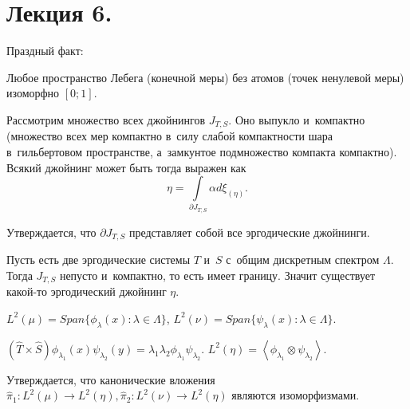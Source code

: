 \documentclass{article}
\begin{document}
\section*{Лекция 6. }
\resetcntrs

Праздный факт:
\begin{theorem}[Рохлин]
	Любое пространство Лебега (конечной меры) без атомов (точек ненулевой меры)
	изоморфно $[0; 1]$.
\end{theorem}

Рассмотрим множество всех джойнингов $J_{T,S}$. Оно выпукло и~компактно
(множество всех мер компактно в~силу слабой компактности шара в~гильбертовом
пространстве, а~замкунтое подмножество компакта компактно). Всякий джойнинг
может быть тогда выражен как
$$ \eta = \int\limits_{\partial J_{T,S}} \alpha d\xi_{(\eta)}. $$

Утверждается, что $\partial J_{T,S}$ представляет собой все эргодические
джойнинги.

Пусть есть две эргодические системы $T$ и~$S$ с~общим дискретным спектром
$\Lambda$. Тогда $J_{T,S}$ непусто и~компактно, то есть имеет границу. Значит
существует какой-то эргодический джойнинг $\eta$.

$L^2(\mu) = Span\{ \phi_\lambda(x): \lambda \in \Lambda \}$,
$L^2(\nu) = Span\{ \psi_\lambda(x): \lambda \in \Lambda \}$.

$(\hat T \times \hat S) \phi_{\lambda_1}(x) \psi_{\lambda_2}(y) = \lambda_1
\lambda_2 \phi_{\lambda_1} \psi_{\lambda_2}$. $L^2(\eta) = \left<
\phi_{\lambda_1} \otimes \psi_{\lambda_2} \right>$.

Утверждается, что канонические вложения $\hat \pi_1: L^2(\mu) \rightarrow
L^2(\eta), \hat \pi_2: L^2(\nu) \rightarrow L^2(\eta)$ являются изоморфизмами.
\end{document}
